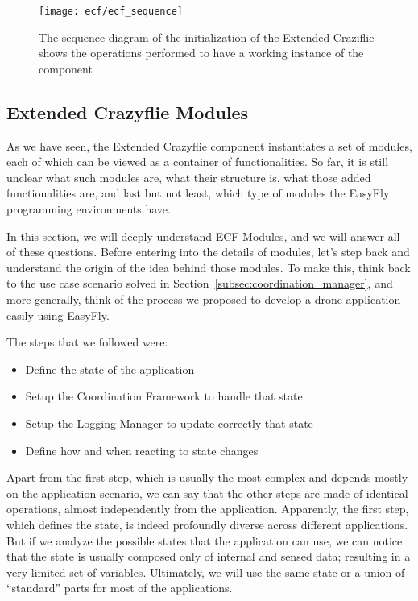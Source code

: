 \begin{figure}[h]
    \centering
    \texttt{[image: ecf/ecf\_sequence]} 
    \caption[ECF initialization sequence diagram]{The sequence diagram of the initialization of the Extended Craziflie shows the operations performed to have a working instance of the component}\label{fig:ecf_sequence}
\end{figure}


\subsection{Extended Crazyflie Modules}\label{subsec:ecf_modules_overview}
As we have seen, the Extended Crazyflie component instantiates a set of modules, each of which can be viewed as a container of functionalities.
So far, it is still unclear what such modules are, what their structure is, what those added functionalities are, and last but not least, which type of modules the EasyFly programming environments have. 

In this section, we will deeply understand ECF Modules, and we will answer all of these questions.
Before entering into the details of modules, let's step back and understand the origin of the idea behind those modules.
To make this, think back to the use case scenario solved in Section~\ref{subsec:coordination_manager}, and more generally, think of the process we proposed to develop a drone application easily using EasyFly.

The steps that we followed were:
\begin{itemize}
    \item Define the state of the application
    \item Setup the Coordination Framework to handle that state
    \item Setup the Logging Manager to update correctly that state
    \item Define how and when reacting to state changes
\end{itemize}

Apart from the first step, which is usually the most complex and depends mostly on the application scenario, we can say that the other steps are made of identical operations, almost independently from the application.
Apparently, the first step, which defines the state, is indeed profoundly diverse across different applications.
But if we analyze the possible states that the application can use, we can notice that the state is usually composed only of internal and sensed data; 
resulting in a very limited set of variables.
Ultimately, we will use the same state or a union of “standard” parts for most of the applications. 


